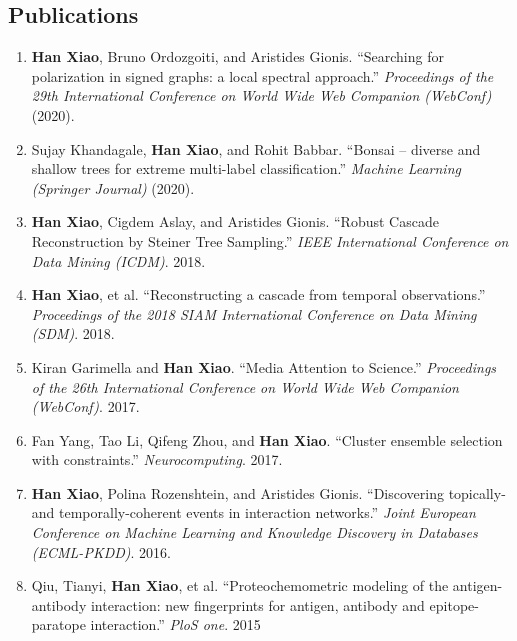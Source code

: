 \documentclass[12pt,]{scrartcl}
\begin{document}
\subsection{Publications}\label{publications}

\begin{enumerate}
  \leftskip-0.13in %
  \item \textbf{Han Xiao}, Bruno Ordozgoiti, and Aristides Gionis. ``Searching for polarization in signed graphs: a local spectral approach.'' \textit{Proceedings of the 29th International Conference on World Wide Web Companion (WebConf)}  (2020).

  \item Sujay Khandagale, \textbf{Han Xiao}, and Rohit Babbar. ``Bonsai -- diverse and shallow trees for extreme multi-label classification.'' \textit{Machine Learning (Springer Journal)} (2020).
  
  \item {\textbf{Han Xiao}, Cigdem Aslay, and Aristides Gionis. ``Robust Cascade Reconstruction by Steiner Tree Sampling.'' \textit{IEEE International Conference on Data Mining (ICDM)}.  2018.}

  \item {\textbf{Han Xiao}, et al. ``Reconstructing a cascade from temporal observations.'' \textit{Proceedings of the 2018 SIAM International Conference on Data Mining (SDM)}. 2018.}
  
  \item {Kiran Garimella and \textbf{Han Xiao}. ``Media Attention to Science.'' \textit{Proceedings of the 26th International Conference on World Wide Web Companion (WebConf)}. 2017.}

  \item {Fan Yang, Tao Li, Qifeng Zhou, and \textbf{Han Xiao}. ``Cluster ensemble selection with constraints.'' \textit{Neurocomputing}. 2017.}

  \item {\textbf{Han Xiao}, Polina Rozenshtein, and Aristides Gionis. ``Discovering topically-and temporally-coherent events in interaction networks.'' \textit{Joint European Conference on Machine Learning and Knowledge Discovery in Databases (ECML-PKDD)}.  2016.}

  \item {Qiu, Tianyi, \textbf{Han Xiao}, et al. ``Proteochemometric modeling of the antigen-antibody interaction: new fingerprints for antigen, antibody and epitope-paratope interaction.'' \textit{PloS one}.  2015}
\end{enumerate}
\end{document}
